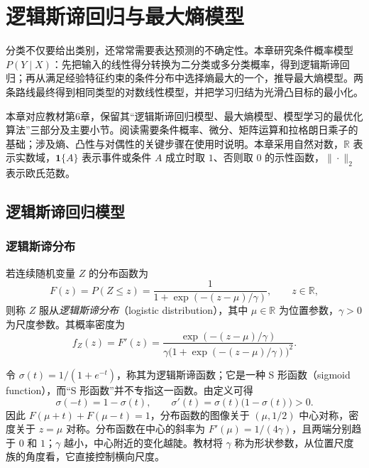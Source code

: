 \setcounter{chapter}{5} %
\chapter{逻辑斯谛回归与最大熵模型}
\label{ch:lh-logistic-maxent}

分类不仅要给出类别，还常常需要表达预测的不确定性。本章研究条件概率模型 $P(Y\mid X)$：先把输入的线性得分转换为二分类或多分类概率，得到逻辑斯谛回归；再从满足经验特征约束的条件分布中选择熵最大的一个，推导最大熵模型。两条路线最终得到相同类型的对数线性模型，并把学习归结为光滑凸目标的最小化。

本章对应教材第6章，保留其“逻辑斯谛回归模型、最大熵模型、模型学习的最优化算法”三部分及主要小节。阅读需要条件概率、微分、矩阵运算和拉格朗日乘子的基础；涉及熵、凸性与对偶性的关键步骤在使用时说明。本章采用自然对数，$\mathbb R$ 表示实数域，$\mathbf 1\{A\}$ 表示事件或条件 $A$ 成立时取 $1$、否则取 $0$ 的示性函数，$\|\cdot\|_2$ 表示欧氏范数。

\section{逻辑斯谛回归模型}
\label{sec:lh-logistic}

\subsection{逻辑斯谛分布}
\label{subsec:lh-logistic-distribution}

\begin{definition}[逻辑斯谛分布]
\label{def:lh-logistic-distribution}
若连续随机变量 $Z$ 的分布函数为
\begin{equation}
F(z)=P(Z\leq z)=\frac{1}{1+\exp(-(z-\mu)/\gamma)},
\qquad z\in\mathbb R,
\label{eq:lh-logistic-cdf}
\end{equation}
则称 $Z$ 服从\emph{逻辑斯谛分布}（logistic distribution），其中 $\mu\in\mathbb R$ 为位置参数，$\gamma>0$ 为尺度参数。其概率密度为
\begin{equation}
f_Z(z)=F'(z)=\frac{\exp(-(z-\mu)/\gamma)}
{\gamma\bigl(1+\exp(-(z-\mu)/\gamma)\bigr)^2}.
\label{eq:lh-logistic-density}
\end{equation}
\end{definition}

令 $\sigma(t)=1/(1+e^{-t})$，称其为逻辑斯谛函数；它是一种 S 形函数（sigmoid function），而“S 形函数”并不专指这一函数。由定义可得
\begin{equation}
\sigma(-t)=1-\sigma(t),\qquad
\sigma'(t)=\sigma(t)\bigl(1-\sigma(t)\bigr)>0.
\label{eq:lh-sigmoid-identities}
\end{equation}
因此 $F(\mu+t)+F(\mu-t)=1$，分布函数的图像关于 $(\mu,1/2)$ 中心对称，密度关于 $z=\mu$ 对称。分布函数在中心的斜率为 $F'(\mu)=1/(4\gamma)$，且两端分别趋于 $0$ 和 $1$；$\gamma$ 越小，中心附近的变化越陡。教材将 $\gamma$ 称为形状参数，从位置尺度族的角度看，它直接控制横向尺度。

